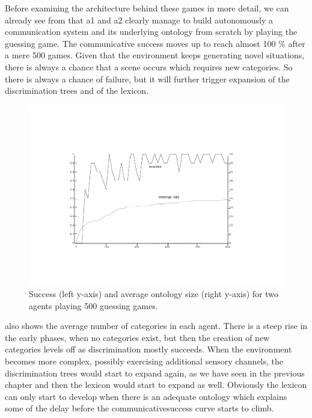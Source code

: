 Before examining the architecture behind these
games in more detail, we can 
already see from  that
{\bfshape  a1} and {\bfshape  a2} clearly manage to build autonomously 
a communication system and its underlying ontology
from scratch by playing the 
guessing game. The communicative success 
moves up to reach almost 100 \% after a mere 500 games. 
Given that the environment keeps generating novel 
situations, there is always a chance that a 
scene occurs which requires new categories. So there 
is always a chance of failure, but it will 
further trigger expansion of the discrimination 
trees and of the lexicon. 
\begin{figure}[htbp]
  \centerline{\includegraphics[width=.70\textwidth]{chap6/figs/gsucc1}}
\caption{\label{gsuccess1} Success 
(left y-axis) and average ontology size
(right y-axis) for two agents playing 500
guessing games.} 
\end{figure}
 also shows the average 
number of categories in each agent. There is a 
steep rise in the early phases, when no categories
exist, but then the creation of new categories levels 
off as discrimination mostly succeeds. When the 
environment becomes more complex, possibly exercising
additional sensory channels, the discrimination
trees would start to expand again, as we have seen 
in the previous chapter and then the lexicon 
would start to expand as well. Obviously the lexicon can only 
start to develop when there is an adequate ontology which 
explains some of the delay before the communicativesuccess curve starts to climb. 

